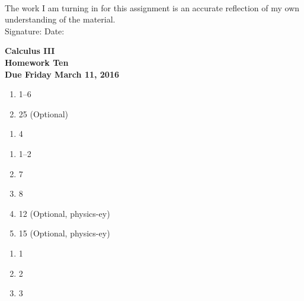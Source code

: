 \documentclass[12pt]{article}
\begin{document}
\\

\bigskip
\bigskip
\bigskip
\bigskip
\bigskip
\bigskip
\noindent The work I am turning in for this assignment is an accurate
reflection of my own understanding of the material.\\[14pt]

\noindent Signature: \underline{\hspace{7cm}} \hspace{1cm} Date:
\underline{\hspace{5cm}} 


\pagestyle{empty}
 
\begin{center}
{\large {\bf Calculus III}}\\
\medskip
{\large {\bf Homework Ten}}\\
\medskip
{ {\bf Due Friday March 11, 2016}}\\
\end{center}


\bigskip




\begin{enumerate}
\setlength{\itemsep}{-1mm}
  \item 1--6
  \item 25 (Optional)
\end{enumerate}


\begin{enumerate}
\setlength{\itemsep}{-1mm}
  \item 4
\end{enumerate}

\begin{enumerate}
\setlength{\itemsep}{-1mm}
  \item 1--2
  \item 7
  \item 8
  \item 12 (Optional, physics-ey)
  \item 15 (Optional, physics-ey)
\end{enumerate}

\begin{enumerate}
\setlength{\itemsep}{-1mm}
  \item 1
  \item 2
  \item 3
\end{enumerate}
\end{document}
